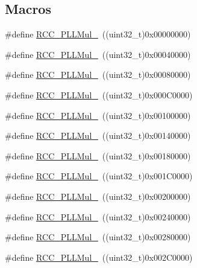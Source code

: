 \subsection*{Macros}
\begin{DoxyCompactItemize}
\item 
\#define \hyperlink{group___p_l_l__multiplication__factor_ga91b3b28fa4d56693d1eb361e24f317af}{R\+C\+C\+\_\+\+P\+L\+L\+Mul\+\_}~((uint32\+\_\+t)0x00000000)
\item 
\#define \hyperlink{group___p_l_l__multiplication__factor_gafc2dd6c503b9ee6e0cfbec6d7d3a3e00}{R\+C\+C\+\_\+\+P\+L\+L\+Mul\+\_}~((uint32\+\_\+t)0x00040000)
\item 
\#define \hyperlink{group___p_l_l__multiplication__factor_ga897be2cbbdabb6035bfe9bd515d6897f}{R\+C\+C\+\_\+\+P\+L\+L\+Mul\+\_}~((uint32\+\_\+t)0x00080000)
\item 
\#define \hyperlink{group___p_l_l__multiplication__factor_gad45e4f8edbbf4d49ded913e83e3a2d06}{R\+C\+C\+\_\+\+P\+L\+L\+Mul\+\_}~((uint32\+\_\+t)0x000\+C0000)
\item 
\#define \hyperlink{group___p_l_l__multiplication__factor_ga2eea74b9955e556b302f4d446dd68eb4}{R\+C\+C\+\_\+\+P\+L\+L\+Mul\+\_}~((uint32\+\_\+t)0x00100000)
\item 
\#define \hyperlink{group___p_l_l__multiplication__factor_ga1c307e520d53fa21bc60efcb71c03e01}{R\+C\+C\+\_\+\+P\+L\+L\+Mul\+\_}~((uint32\+\_\+t)0x00140000)
\item 
\#define \hyperlink{group___p_l_l__multiplication__factor_ga8c1f1c5fe591f062078acf603bfbfb06}{R\+C\+C\+\_\+\+P\+L\+L\+Mul\+\_}~((uint32\+\_\+t)0x00180000)
\item 
\#define \hyperlink{group___p_l_l__multiplication__factor_ga984bc5a117e3c6066e2fc7b29a0affda}{R\+C\+C\+\_\+\+P\+L\+L\+Mul\+\_}~((uint32\+\_\+t)0x001\+C0000)
\item 
\#define \hyperlink{group___p_l_l__multiplication__factor_ga572881d8c1e6c5b635198b286a2f4087}{R\+C\+C\+\_\+\+P\+L\+L\+Mul\+\_}~((uint32\+\_\+t)0x00200000)
\item 
\#define \hyperlink{group___p_l_l__multiplication__factor_ga15da9e109b8556e96bdb9543347366c9}{R\+C\+C\+\_\+\+P\+L\+L\+Mul\+\_}~((uint32\+\_\+t)0x00240000)
\item 
\#define \hyperlink{group___p_l_l__multiplication__factor_ga5c6729e9c63b3e84d1a86a6b0f571f88}{R\+C\+C\+\_\+\+P\+L\+L\+Mul\+\_}~((uint32\+\_\+t)0x00280000)
\item 
\#define \hyperlink{group___p_l_l__multiplication__factor_ga78b3638b79c30920c09f18206daafc7a}{R\+C\+C\+\_\+\+P\+L\+L\+Mul\+\_}~((uint32\+\_\+t)0x002\+C0000)

\end{DoxyCompactItemize}
